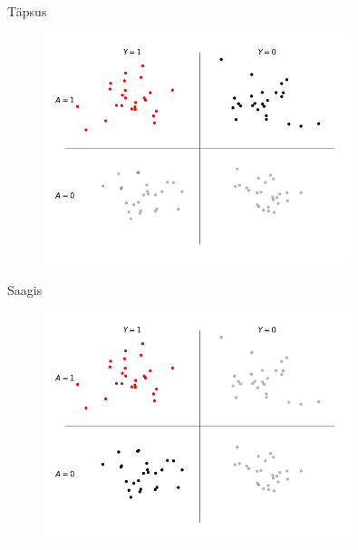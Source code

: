 \documentclass{beamer}
\begin{document}
\begin{frame}{Täpsus}
    \begin{figure}[H]
        \includegraphics[width=0.8\textwidth]{segadusmaatriks_tapsus.png}
    \end{figure}
\end{frame}

\begin{frame}{Saagis}
    \begin{figure}[H]
        \includegraphics[width=0.8\textwidth]{segadusmaatriks_saagis.png}
    \end{figure}
\end{frame}
\end{document}
